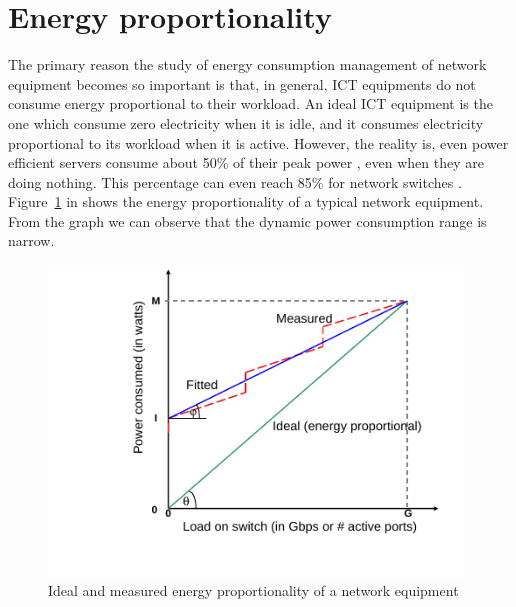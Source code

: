 \section{Energy proportionality}
\label{section:energyproportionality}
The primary reason the study of energy consumption management of network equipment becomes so important is that, in general, ICT equipments do not consume energy proportional to their workload. An ideal ICT equipment is the one which consume zero electricity when it is idle, and it consumes electricity proportional to its workload when it is active. However, the reality is, even power efficient servers consume about 50\% of their peak power \cite{DBLP:journals/computer/BarrosoH07}, even when they are doing nothing. This percentage can even reach 85\% for network switches \cite{DBLP:conf/IEEEcloud/FiandrinoKBZ15}. Figure~\ref{fig:energyproportionality} in \cite{DBLP:conf/networking/MahadevanSBR09} shows the energy proportionality of a typical network equipment. From the graph we can observe that the dynamic power consumption range is narrow.
\begin{figure}[ht]
	\begin{center}
		\includegraphics[width=11cm]{images/energyproportionality.pdf}
		\caption{Ideal and measured energy proportionality of a network equipment \cite{DBLP:conf/networking/MahadevanSBR09}}
		\label{fig:energyproportionality}
	\end{center}
\end{figure}
